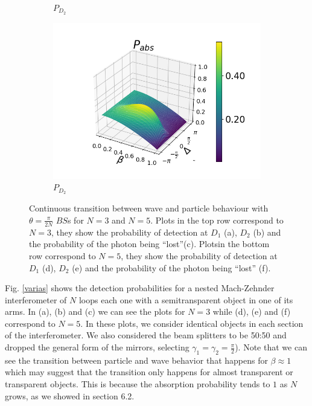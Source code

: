 \documentclass[12pt]{book}
\begin{document}
\begin{figure}[t!]
\begin{subfigure}[b]{0.3\linewidth}
\caption{$P_{D_{2}}$ }
\label{fig:BS1}
\end{subfigure}
\begin{subfigure}[b]{0.3\linewidth}
\includegraphics[width=\linewidth]{images/pabs_5.png}
\caption{$P_{D_{2}}$ }
\label{fig:BS1}
\end{subfigure}
\caption{Continuous transition between wave and particle behaviour with $\theta=\frac{\pi}{2N}$ $BS$s for $N=3$ and $N=5$. Plots in the top row correspond to $N=3$, they show the probability of detection at $D_{1}$ (a), $D_{2}$ (b) and the probability of the photon being ``lost''(c). Plotsin the bottom row correspond to $N=5$, they show the probability of detection at $D_{1}$ (d),  $D_{2}$ (e) and the probability of the photon being ``lost'' (f).}
\label{figvarias2}
\end{figure}

Fig. \ref{varias} shows the detection probabilities for a nested Mach-Zehnder interferometer of $N$ loops each one with a semitransparent object in one of its arms. In (a), (b) and (c) we can see the plots for $N=3$ while (d), (e) and (f) correspond to $N=5$. In these plots, we consider identical objects in each section of the interferometer. We also considered the beam splitters to be 50:50 and dropped the general form of the mirrors, selecting $\gamma_{1}=\gamma_{2}=\frac{\pi}{2}$). Note that we can see the transition between particle and wave behavior that happens for $\beta \approx 1$ which may suggest that the transition only happens for almost transparent or transparent objects. This is because the absorption probability tends to $1$ as $N$ grows, as we showed in section 6.2. 
\end{document}
